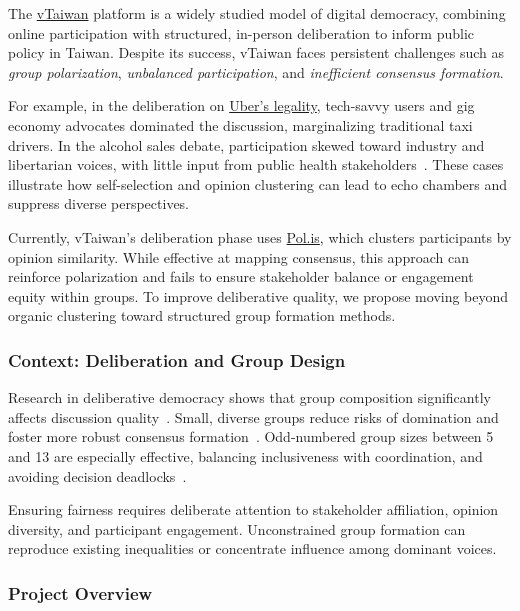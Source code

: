 The \href{https://vtaiwan.tw}{vTaiwan} platform is a widely studied model of digital democracy,
combining online participation with structured, in-person deliberation to inform public policy in Taiwan.
Despite its success, vTaiwan faces persistent challenges such as \textit{group polarization},
\textit{unbalanced participation}, and \textit{inefficient consensus formation}.

For example, in the deliberation on
\href{https://blog.pol.is/uber-responds-to-vtaiwans-coherent-blended-volition-3e9b75102b9b}{Uber's legality},
tech-savvy users and gig economy advocates dominated the discussion,
marginalizing traditional taxi drivers.
In the alcohol sales debate, participation skewed toward industry and libertarian voices,
with little input from public health stakeholders~\parencite{tiku2018taiwan}.
These cases illustrate how self-selection and opinion clustering can lead to echo chambers
and suppress diverse perspectives.

Currently, vTaiwan's deliberation phase uses \href{https://pol.is/home}{Pol.is},
which clusters participants by opinion similarity.
While effective at mapping consensus, this approach can reinforce polarization
and fails to ensure stakeholder balance or engagement equity within groups.
To improve deliberative quality, we propose moving beyond organic clustering
toward structured group formation methods.

\subsubsection*{Context: Deliberation and Group Design}

Research in deliberative democracy shows that group composition
significantly affects discussion quality~\parencite{fay2000group}.
Small, diverse groups reduce risks of domination
and foster more robust consensus formation~\parencite{anagnostopoulos2012groupformation}.
Odd-numbered group sizes between 5 and 13 are especially effective,
balancing inclusiveness with coordination,
and avoiding decision deadlocks~\parencite{fishkin2009deliberative, menon2011oddgroups}.

Ensuring fairness requires deliberate attention to stakeholder affiliation, opinion diversity,
and participant engagement.
Unconstrained group formation can reproduce existing inequalities
or concentrate influence among dominant voices.

\subsubsection*{Project Overview}

